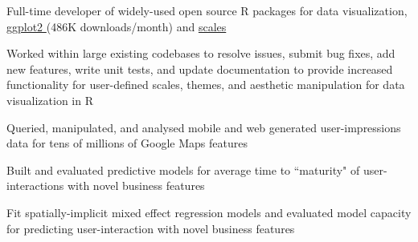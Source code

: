 \documentclass[]{deedy-resume-openfont}
\begin{document}
\begin{minipage}[t]{0.66\textwidth}
\begin{tightemize}
\item Full-time developer of widely-used open source R packages for data visualization, \href{https://github.com/tidyverse/ggplot2}{ggplot2 \faGithub{}} (486K downloads/month) and \href{https://github.com/r-lib/scales}{scales \faGithub}
\item Worked within large existing codebases to resolve issues, submit bug fixes, add new features, write unit tests, and update documentation to provide increased functionality for user-defined scales, themes, and aesthetic manipulation for data visualization in R
\end{tightemize}
\sectionsep

\begin{tightemize}
\item Queried, manipulated, and analysed mobile and web generated user-impressions data for tens of millions of Google Maps features %
\item Built and evaluated predictive models for average time to ``maturity" of user-interactions with novel business features
\item Fit spatially-implicit mixed effect regression models and evaluated model capacity for predicting user-interaction with novel business features
\end{tightemize}



\end{minipage}
\end{document}
